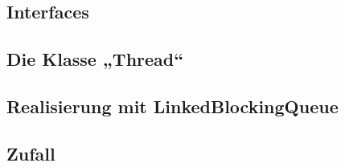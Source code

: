 \subsection{Interfaces} %
\label{sub:interfaces}


\subsection{Die Klasse „Thread“} %
\label{sub:die_klasse_thread}


\subsection{Realisierung mit LinkedBlockingQueue} %
\label{sub:realisierung_mit_linkedblockingqueue}


\subsection{Zufall} %
\label{sub:zufall}



